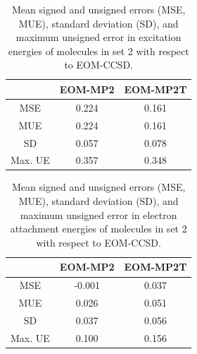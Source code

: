 \documentclass[12pt,nofootinbib]{revtex4}
\begin{document}
\begin{table}[htbp]
	\centering
	\caption{Mean signed and unsigned errors (MSE, MUE), standard deviation (SD), and maximum unsigned error in excitation energies of molecules in set 2 with respect to EOM-CCSD.}
	\begin{tabular}{ccc}
		\toprule
		& EOM-MP2 & EOM-MP2T \\
		\hline
		MSE   & 0.224 & 0.161 \\
		MUE   & 0.224 & 0.161 \\
		SD    & 0.057 & 0.078 \\
		Max. UE & 0.357 & 0.348 \\
		\hline
	\end{tabular}%
	\label{tab:set2_ee}%
\end{table}%


\begin{table}[htbp]
	\centering
	\caption{Mean signed and unsigned errors (MSE, MUE), standard deviation (SD), and maximum unsigned error in electron attachment energies of molecules in set 2 with respect to EOM-CCSD.}
	\begin{tabular}{ccc}
		\toprule
		& EOM-MP2 & EOM-MP2T \\
		\hline
		MSE   & -0.001 & 0.037 \\
		MUE   & 0.026 & 0.051 \\
		SD    & 0.037 & 0.056 \\
		Max. UE & 0.100 & 0.156 \\
		\hline
	\end{tabular}%
	\label{tab:set2_ea}%
\end{table}%



\end{document}

